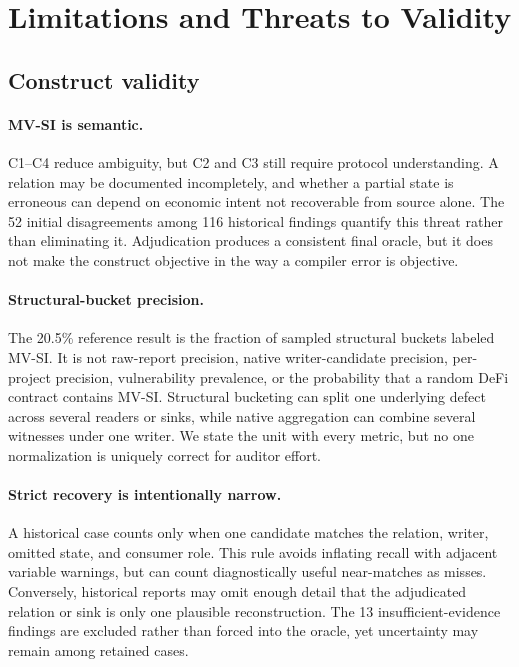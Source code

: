 
\section{Limitations and Threats to Validity}
\label{s:limitations}

\subsection{Construct validity}
\label{s:limitations-construct}

\paragraph{MV-SI is semantic.}
C1--C4 reduce ambiguity, but C2 and C3 still require protocol understanding. A relation may be documented incompletely, and whether a partial state is erroneous can depend on economic intent not recoverable from source alone. The 52 initial disagreements among 116 historical findings quantify this threat rather than eliminating it. Adjudication produces a consistent final oracle, but it does not make the construct objective in the way a compiler error is objective.

\paragraph{Structural-bucket precision.}
The 20.5\% reference result is the fraction of sampled structural buckets labeled MV-SI. It is not raw-report precision, native writer-candidate precision, per-project precision, vulnerability prevalence, or the probability that a random DeFi contract contains MV-SI. Structural bucketing can split one underlying defect across several readers or sinks, while native aggregation can combine several witnesses under one writer. We state the unit with every metric, but no one normalization is uniquely correct for auditor effort.

\paragraph{Strict recovery is intentionally narrow.}
A historical case counts only when one candidate matches the relation, writer, omitted state, and consumer role. This rule avoids inflating recall with adjacent variable warnings, but can count diagnostically useful near-matches as misses. Conversely, historical reports may omit enough detail that the adjudicated relation or sink is only one plausible reconstruction. The 13 insufficient-evidence findings are excluded rather than forced into the oracle, yet uncertainty may remain among retained cases.

